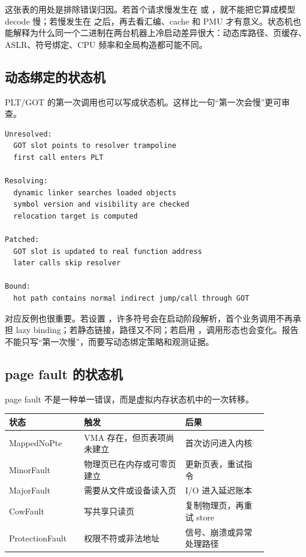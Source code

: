 这张表的用处是排除错误归因。若首个请求慢发生在  或 ，就不能把它算成模型 decode 慢；若慢发生在  之后，再去看汇编、cache 和 PMU 才有意义。状态机也能解释为什么同一个二进制在两台机器上冷启动差异很大：动态库路径、页缓存、ASLR、符号绑定、CPU 频率和全局构造都可能不同。

\subsection{动态绑定的状态机}

PLT/GOT 的第一次调用也可以写成状态机。这样比一句“第一次会慢”更可审查。

\begin{lstlisting}[numbers=none,caption={lazy binding 状态机}]
Unresolved:
  GOT slot points to resolver trampoline
  first call enters PLT

Resolving:
  dynamic linker searches loaded objects
  symbol version and visibility are checked
  relocation target is computed

Patched:
  GOT slot is updated to real function address
  later calls skip resolver

Bound:
  hot path contains normal indirect jump/call through GOT
\end{lstlisting}

对应反例也很重要。若设置 ，许多符号会在启动阶段解析，首个业务调用不再承担 lazy binding；若静态链接，路径又不同；若启用 ，调用形态也会变化。报告不能只写“第一次慢”，而要写动态绑定策略和观测证据。

\subsection{page fault 的状态机}

page fault 不是一种单一错误，而是虚拟内存状态机中的一次转移。

\begin{center}
\begin{tabular}{p{0.24\linewidth}p{0.34\linewidth}p{0.28\linewidth}}
\toprule
状态 & 触发 & 后果 \\
\midrule
MappedNoPte & VMA 存在，但页表项尚未建立 & 首次访问进入内核 \\
MinorFault & 物理页已在内存或可零页建立 & 更新页表，重试指令 \\
MajorFault & 需要从文件或设备读入页 & I/O 进入延迟账本 \\
CowFault & 写共享只读页 & 复制物理页，再重试 store \\
ProtectionFault & 权限不符或非法地址 & 信号、崩溃或异常处理路径 \\
\bottomrule
\end{tabular}
\end{center}

